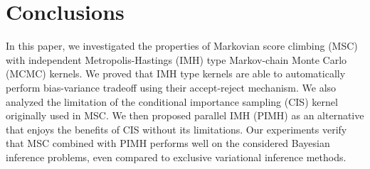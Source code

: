 
\section{Conclusions}
In this paper, we investigated the properties of Markovian score climbing (MSC) with independent Metropolis-Hastings (IMH) type Markov-chain Monte Carlo (MCMC) kernels.
We proved that IMH type kernels are able to automatically perform bias-variance tradeoff using their accept-reject mechanism.
We also analyzed the limitation of the conditional importance sampling (CIS) kernel originally used in MSC.
We then proposed parallel IMH (PIMH) as an alternative that enjoys the benefits of CIS without its limitations.
Our experiments verify that MSC combined with PIMH performs well on the considered Bayesian inference problems, even compared to exclusive variational inference methods.


